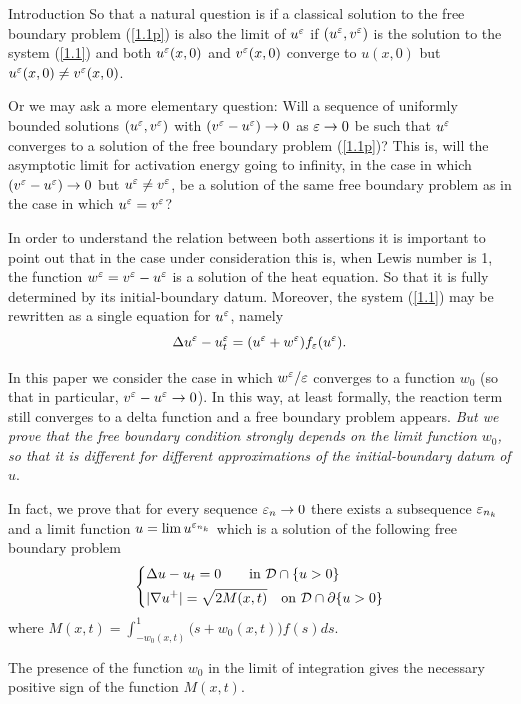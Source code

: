 \begin{section}{Introduction}
So that a natural question is if a classical solution to the free boundary
problem (\ref{1.1p}) is also the limit of $u^\varepsilon$ if $(u^\varepsilon,v^\varepsilon)$ is the solution
to the system (\ref{1.1}) and both $u^\varepsilon(x,0)$ and $v^\varepsilon(x,0)$ converge 
to $u(x,0)$  but $u^\varepsilon(x,0)\neq v^\varepsilon(x,0)$.

Or we may ask a more elementary question: Will a sequence of uniformly
bounded solutions $(u^\varepsilon,v^\varepsilon)$ with $(v^\varepsilon-u^\varepsilon)\to0$ as $\varepsilon\to0$ be such
that $u^\varepsilon$ converges to a solution of the free boundary problem (\ref{1.1p})?
This is, will the asymptotic limit for activation energy going to infinity, in the case
in which $(v^\varepsilon-u^\varepsilon)\to0$ but $u^\varepsilon\neq v^\varepsilon$, be a solution of the same free boundary
problem as in the case in which $u^\varepsilon=v^\varepsilon$?

In order to understand the relation between both assertions it is important
to point out that in the case under consideration this is, when Lewis number
is 1, the function $w^\varepsilon=v^\varepsilon-u^\varepsilon$ is a solution of the heat equation. So that
it is fully determined by its initial-boundary datum. Moreover,
the system (\ref{1.1}) may be rewritten as a single equation for $u^\varepsilon$, namely
\begin{equation}
\label{reduced}
\Delta u^\varepsilon-u^\varepsilon_t=(u^\varepsilon+w^\varepsilon)f_\varepsilon(u^\varepsilon).
\end{equation}

In this paper we consider the case in which $w^\varepsilon/\varepsilon$ converges to a 
function $w_0$ (so that in particular, $v^\varepsilon-u^\varepsilon\to0$). In this way, at least
formally, the reaction term still converges to a delta function and a free
boundary problem appears. {\it But we prove that the free boundary condition strongly
depends on the limit function $w_0$, so that it is different for different
approximations of the initial-boundary datum of $u$}.

In fact, we prove that for every sequence $\varepsilon_{n}\to0$ there exists a subsequence
$\varepsilon_{n_k}$ and a limit function $u=\lim u^{\varepsilon_{n_k}}$ which is a solution of the
following free boundary problem
\begin{equation}
\label{FBP}
\left\{
\begin{aligned}
&\Delta u - u_t  =  0  \quad\ \ \ \mbox{in } {\cal D}\cap \{u>0\}\\
&|\nabla u^+|  =  \sqrt{2M(x,t)} \quad \mbox{on } {\cal D}\cap\partial\{u>0\}
\end{aligned}
\right.
\end{equation}
where $M(x,t)=\int_{-w_0(x,t)}^1\big(s+w_0(x,t)\big)f(s)ds$.

The presence of the function $w_0$ in the limit of integration gives the
necessary positive sign of the function $M(x,t)$.


\end{section}
